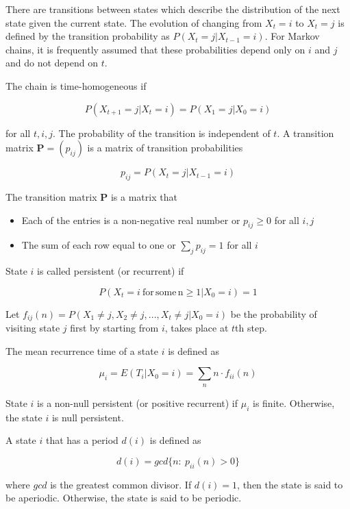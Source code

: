 There are transitions between states which describe the distribution
of the next state given the current state. The evolution of changing
from $X_{t}=i$ to $X_{t}=j$ is defined by the transition probability
as $P(X_{t}=j|X_{t-1}=i)$. For Markov chains, it is frequently assumed
that these probabilities depend only on $i$ and $j$ and do not depend
on $t$.
\begin{defn}
\citep[p.214]{grimmett2001probability} The chain is time-homogeneous
if

\[
P(X_{t+1}=j|X_{t}=i)=P(X_{1}=j|X_{0}=i)
\]

for all $t,i,j$. The probability of the transition is independent
of $t$. A transition matrix $\mathbf{P}=(p_{ij})$ is a matrix of
transition probabilities 

\[
p_{ij}=P(X_{t}=j|X_{t-1}=i)
\]
\end{defn}
\begin{thm*}
\citep[p.215]{grimmett2001probability} The transition matrix $\mathbf{P}$
is a matrix that
\begin{itemize}
\item Each of the entries is a non-negative real number or $p_{ij}\ge0$
for all $i,j$
\item The sum of each row equal to one or $\sum_{j}p_{ij}=1$ for all $i$
\end{itemize}
\end{thm*}

\begin{defn}
\citep[p.220]{grimmett2001probability} State $i$ is called persistent
(or recurrent) if

\[
P(X_{t}=i\mathrm{\:for\,}\mathrm{some\,\mathrm{n}}\geq1|X_{0}=i)=1
\]
\end{defn}

Let $f_{ij}(n)=P(X_{1}\neq j,X_{2}\neq j,...,X_{t}\neq j|X_{0}=i)$
be the probability of visiting state $j$ first by starting from $i$,
takes place at $t$th step.

\begin{defn}
\citep[p.222]{grimmett2001probability} The mean recurrence time of
a state $i$ is defined as

\[
\mu_{i}=E(T_{i}|X_{0}=i)=\sum_{n}n\cdot f_{ii}(n)
\]

State $i$ is a non-null persistent (or positive recurrent) if $\mu_{i}$
is finite. Otherwise, the state $i$ is null persistent. 
\end{defn}

\begin{defn}
\citep[p.222]{grimmett2001probability} A state $i$ that has a period
$d(i)$ is defined as 

\[
d(i)=gcd\{n:\:p_{ii}(n)>0\}
\]

where $gcd$ is the greatest common divisor. If $d(i)=1$, then the
state is said to be aperiodic. Otherwise, the state is said to be
periodic. 
\end{defn}

